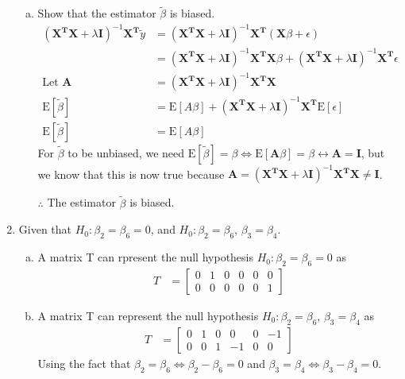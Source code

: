 \documentclass[12pt]{article}
\newcommand{\ytilde}{\tilde{y}}
\newcommand{\X}{\mathbf{X}}
\newcommand{\btilde}{\tilde{\beta}}
\newcommand{\I}{\mathbf{I}}
\newcommand{\T}{\mathbf{T}}
\begin{document}
\begin{enumerate}[1.]
\begin{enumerate}[a)]
                \item Show that the estimator $\btilde$ is biased.
                \begin{align*}
                    (\X^\T \X + \lambda \I)^{-1} \X^\T \ytilde &= (\X^\T \X + \lambda \I)^{-1} \X^\T (\X \beta + \epsilon) \\
                    &= (\X^\T \X + \lambda \I)^{-1} \X^\T \X \beta + (\X^\T \X + \lambda \I)^{-1} \X^\T \epsilon \\
                    \text{Let } \mathbf{A} & = (\X^\T \X + \lambda \I)^{-1} \X^\T \X \\
                    \text{E}[\btilde] &= \text{E}[A \beta] + (\X^\T \X + \lambda \I)^{-1} \X^\T \text{E}[\epsilon] \\
                    \text{E}[\btilde] &= \text{E}[A \beta]
                \end{align*}
                For $\btilde$ to be unbiased, we need $\text{E}[\btilde] = \beta \Leftrightarrow \text{E}[\mathbf{A} \beta] = \beta \leftrightarrow \mathbf{A} = \I$,
                but we know that this is now true because $\mathbf{A} = (\X^\T \X + \lambda \I)^{-1} \X^\T \X \neq \I$.

                $\therefore$ The estimator $\btilde$ is biased.
            \end{enumerate}

            \item Given that $H_0: \beta_2 = \beta_6 = 0$, and $H_0: \beta_2 = \beta_6$, $\beta_3 = \beta_4$.
                \begin{enumerate}[a)]
                    \item A matrix T can rpresent the null hypothesis $H_0: \beta_2 = \beta_6 = 0$ as
                    \begin{align*}
                        T &= \begin{bmatrix} 0 & 1 & 0 & 0 & 0 & 0 \\ 0 & 0 & 0 & 0 & 0 & 1 \end{bmatrix}
                    \end{align*}
                    \item A matrix T can represent the null hypothesis $H_0: \beta_2 = \beta_6$, $\beta_3 = \beta_4$ as
                    \begin{align*}
                        T &= \begin{bmatrix} 0 & 1 & 0 & 0 & 0 & -1 \\ 0 & 0 & 1 & -1 & 0 & 0 \end{bmatrix}
                    \end{align*}
                    Using the fact that $\beta_2 = \beta_6 \Leftrightarrow \beta_2 - \beta_6 = 0$ and $\beta_3 = \beta_4 \Leftrightarrow \beta_3 - \beta_4 = 0$.
                    

\end{enumerate}
\end{enumerate}
\end{document}
